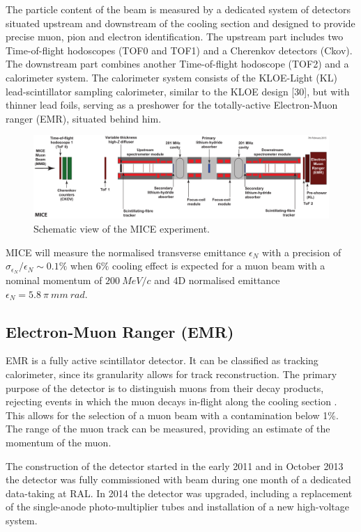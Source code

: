 \documentclass[a4paper,11pt]{article}
\begin{document}
The particle content of the beam is measured by a dedicated system of detectors situated upstream and downstream of the
cooling section and designed to provide precise muon, pion and electron identification. The upstream part includes two
Time-of-flight hodoscopes (TOF0 and TOF1) and a Cherenkov detectors (Ckov). The downstream part combines another 
Time-of-flight hodoscope (TOF2) and a calorimeter system. The calorimeter system consists of the KLOE-Light (KL)
lead-scintillator sampling calorimeter, similar to the KLOE design [30], but with thinner lead foils, serving
as a preshower for the totally-active Electron-Muon ranger (EMR), situated behind him.

\begin{figure}[h]
 \includegraphics[width=.95\textwidth]{./Cooling-demo.pdf}
 \caption{Schematic view of the MICE experiment.}
 \label{mice}
\end{figure}

MICE will measure the normalised transverse emittance $\epsilon_N$ with a precision of 
$\sigma_{\epsilon_N}/\epsilon_N \sim 0.1 \%$ when $6\%$ cooling effect is  expected for a muon beam with a nominal momentum
of $200 \ MeV/c$ and 4D normalised emittance $\epsilon_N = 5.8 \ \pi~mm~rad$.

\subsection{Electron-Muon Ranger (EMR)}
EMR is a fully active scintillator detector. It can be classified as tracking calorimeter, since its granularity allows for track
reconstruction. The primary purpose of the detector is to distinguish muons from their decay products, rejecting events in which
the muon decays in-flight along the cooling section \cite{ruslan}.  This allows for the selection of a muon beam with a contamination
below 1\%. The range of the muon track can be measured, providing an estimate of the momentum of the muon. 

The construction of the detector started in the early 2011 and in October 2013 the detector was fully commissioned with beam
during one month of a dedicated data-taking at RAL. In 2014 the detector was upgraded, including a replacement of the single-anode
photo-multiplier tubes and installation of a new high-voltage system.
\end{document}
